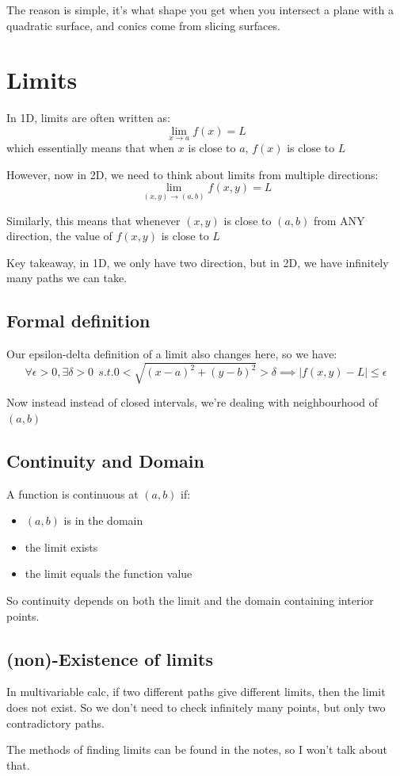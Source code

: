 The reason is simple, it's what shape you get when you intersect a plane with a quadratic surface, and conics come from slicing surfaces. 

\chapter{Limits}

In 1D, limits are often written as: 
$$
\lim_{x \to a} f(x) = L
$$
which essentially means that when $x$ is close to $a$, $f(x)$ is close to $L$ 

However, now in 2D, we need to think about limits from multiple directions: 
$$
\lim_{(x,y) \to (a,b)} f(x,y) = L 
$$

Similarly, this means that whenever $(x,y)$ is close to $(a,b)$ from ANY direction, the value of $f(x,y)$ is close to $L$

Key takeaway, in 1D, we only have two direction, but in 2D, we have infinitely many paths we can take. 

\section{Formal definition}

Our epsilon-delta definition of a limit also changes here, so we have: 
$$
\forall \epsilon > 0, \exists \delta > 0 \ \ s.t. 0 < \sqrt{(x-a)^2 + (y-b)^2} > \delta \implies | f(x,y)- L| \leq \epsilon
$$

Now instead instead of closed intervals, we're dealing with neighbourhood of $(a,b)$

\section{Continuity and Domain}

A function is continuous at $(a,b)$ if: 
\begin{itemize}
    \item $(a,b)$ is in the domain 
    \item the limit exists 
    \item the limit equals the function value
\end{itemize}

So continuity depends on both the limit and the domain containing interior points. 


\section{(non)-Existence of limits}

In multivariable calc, if two different paths give different limits, then the limit does not exist. So we don't need to check infinitely many points, but only two contradictory paths. 

The methods of finding limits can be found in the notes, so I won't talk about that. 
